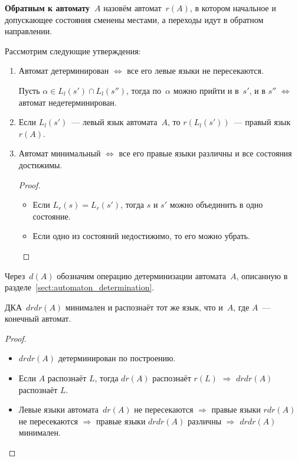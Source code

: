 \textbf{Обратным к автомату~$A$} назовём автомат~$r(A)$, в котором начальное и допускающее состояния сменены местами, а переходы идут в обратном направлении.

Рассмотрим следующие утверждения:
\begin{enumerate}
	\item Автомат детерминирован $\Leftrightarrow$ все его левые языки не пересекаются.
	\begin{proofcontra}
	Пусть $\alpha \in L_l(s') \cap L_l(s'')$, тогда по~$\alpha$ можно прийти и в~$s'$, и в $s''$ $\Leftrightarrow$ автомат недетерминирован.
	\end{proofcontra}
	
	\item Если $L_l(s')$~--- левый язык автомата~$A$, то $r(L_l(s'))$~--- правый язык~$r(A)$.
	
	\item Автомат минимальный $\Leftrightarrow$ все его правые языки различны и все состояния достижимы.
	\begin{proof}
	\begin{itemize}
		\item Если $L_r(s) = L_r(s')$, тогда $s$ и $s'$ можно объединить в одно состояние.
		\item Если одно из состояний недостижимо, то его можно убрать.
	\end{itemize}
	\end{proof}
\end{enumerate}

Через~$d(A)$ обозначим операцию детерминизации автомата~$A$, описанную в разделе~\ref{sect:automaton_determination}.

\begin{theorem}[Бржозовского]
ДКА~$drdr(A)$ минимален и распознаёт тот же язык, что и~$A$, где $A$~--- конечный автомат.
\end{theorem}
\begin{proof}
\begin{itemize}
	\item $drdr(A)$ детерминирован по построению.
	\item Если $A$ распознаёт $L$, тогда $dr(A)$ распознаёт $r(L)$ $\Rightarrow$ $drdr(A)$ распознаёт $L$.
	\item Левые языки автомата~$dr(A)$ не пересекаются $\Rightarrow$ правые языки $rdr(A)$ не пересекаются $\Rightarrow$ правые языки $drdr(A)$ различны $\Rightarrow$ $drdr(A)$ минимален.
\end{itemize}
\end{proof}